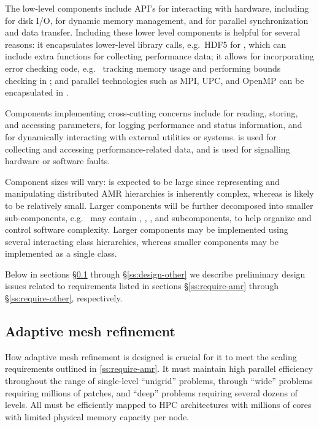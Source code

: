 \documentclass[10pt,twocolumn]{article}
\begin{document}
The low-level components include API's for interacting with hardware,
including  for disk I/O,  for dynamic memory
management, and  for parallel synchronization and data
transfer.  Including these lower level components is helpful for
several reasons: it encapsulates lower-level library calls, e.g.~HDF5
for , which can include extra functions for collecting
performance data; it allows for incorporating error checking code,
e.g.~ tracking memory usage and performing bounds checking in
; and parallel technologies such as MPI, UPC, and OpenMP
can be encapsulated in .

Components implementing cross-cutting concerns include
 for reading, storing, and accessing parameters,
 for logging performance and status information, and
 for dynamically interacting with external utilities or
systems.   is used for collecting and accessing
performance-related data, and  is used for signalling
hardware or software faults.

Component sizes will vary:  is expected to be large since
representing and manipulating distributed AMR hierarchies is
inherently complex, whereas  is likely to be relatively
small.  Larger components will be further decomposed into smaller
sub-components, e.g.~ may contain , ,
, and  subcomponents, to help organize and
control software complexity.  Larger components may be implemented
using several interacting class hierarchies, whereas smaller
components may be implemented as a single class.

Below in sections \S\ref{ss:design-amr} through
\S\ref{ss:design-other} we describe preliminary design issues
related to requirements listed in sections \S\ref{ss:require-amr}
through \S\ref{ss:require-other}, respectively.

\subsection{Adaptive mesh refinement} \label{ss:design-amr}

How adaptive mesh refinement is designed is crucial for it to meet the
scaling requirements outlined in \ref{ss:require-amr}.  It must
maintain high parallel efficiency throughout the range of single-level
``unigrid'' problems, through ``wide'' problems requiring millions of
patches, and ``deep'' problems requiring several dozens of levels.
All must be efficiently mapped to HPC architectures with millions of
cores with limited physical memory capacity per node.
\end{document}
